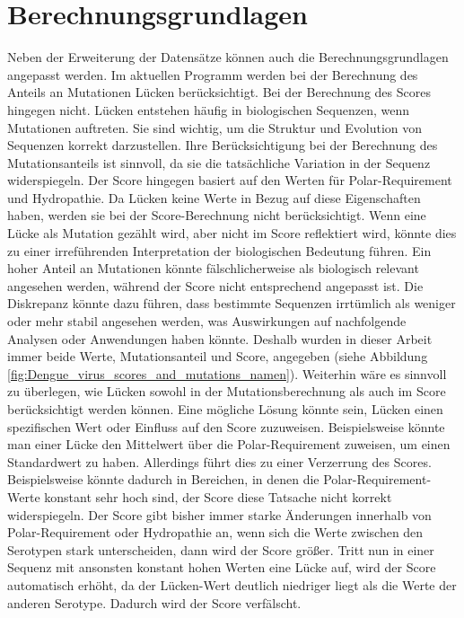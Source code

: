 \documentclass[german,version-2022-01]{uzl-thesis}
\begin{document}
\section{Berechnungsgrundlagen}
Neben der Erweiterung der Datens\"atze k\"onnen auch die Berechnungsgrundlagen angepasst werden. Im aktuellen Programm werden bei der Berechnung des Anteils an Mutationen L\"ucken ber\"ucksichtigt. Bei der Berechnung des Scores hingegen nicht. L\"ucken entstehen h\"aufig in biologischen Sequenzen, wenn Mutationen auftreten. Sie sind wichtig, um die Struktur und Evolution von Sequenzen korrekt darzustellen. Ihre Ber\"ucksichtigung bei der Berechnung des Mutationsanteils ist sinnvoll, da sie die tats\"achliche Variation in der Sequenz widerspiegeln. Der Score hingegen basiert auf den Werten f\"ur Polar-Requirement und Hydropathie. Da L\"ucken keine Werte in Bezug auf diese Eigenschaften haben, werden sie bei der Score-Berechnung nicht ber\"ucksichtigt. Wenn eine L\"ucke als Mutation gez\"ahlt wird, aber nicht im Score reflektiert wird, k\"onnte dies zu einer irref\"uhrenden Interpretation der biologischen Bedeutung f\"uhren. Ein hoher Anteil an Mutationen k\"onnte f\"alschlicherweise als biologisch relevant angesehen werden, w\"ahrend der Score nicht entsprechend angepasst ist. Die Diskrepanz k\"onnte dazu f\"uhren, dass bestimmte Sequenzen irrt\"umlich als weniger oder mehr stabil angesehen werden, was Auswirkungen auf nachfolgende Analysen oder Anwendungen haben k\"onnte. Deshalb wurden in dieser Arbeit immer beide Werte, Mutationsanteil und Score, angegeben (siehe Abbildung \ref{fig:Dengue_virus_scores_and_mutations_namen}). Weiterhin w\"are es sinnvoll zu \"uberlegen, wie L\"ucken sowohl in der Mutationsberechnung als auch im Score ber\"ucksichtigt werden k\"onnen. Eine m\"ogliche L\"osung k\"onnte sein, L\"ucken einen spezifischen Wert oder Einfluss auf den Score zuzuweisen. Beispielsweise k\"onnte man einer L\"ucke den Mittelwert \"uber die Polar-Requirement zuweisen, um einen Standardwert zu haben. Allerdings f\"uhrt dies zu einer Verzerrung des Scores. Beispielsweise k\"onnte dadurch in Bereichen, in denen die Polar-Requirement-Werte konstant sehr hoch sind, der Score diese Tatsache nicht korrekt widerspiegeln. Der Score gibt bisher immer starke \"Anderungen innerhalb von Polar-Requirement oder Hydropathie an, wenn sich die Werte zwischen den Serotypen stark unterscheiden, dann wird der Score gr\"o\ss{}er. Tritt nun in einer Sequenz mit ansonsten konstant hohen Werten eine L\"ucke auf, wird der Score automatisch erh\"oht, da der L\"ucken-Wert deutlich niedriger liegt als die Werte der anderen Serotype. Dadurch wird der Score verf\"alscht.
\end{document}
